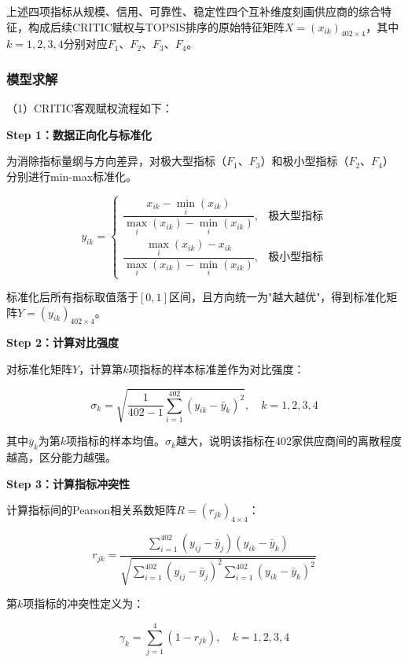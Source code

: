\documentclass[12pt,a4paper]{ctexart}
\theoremstyle{definition}
\theoremstyle{plain}
\theoremstyle{remark}
\begin{document}
上述四项指标从规模、信用、可靠性、稳定性四个互补维度刻画供应商的综合特征，构成后续CRITIC赋权与TOPSIS排序的原始特征矩阵$X = (x_{ik})_{402 \times 4}$，其中$k = 1, 2, 3, 4$分别对应$F_1$、$F_2$、$F_3$、$F_4$。

\subsubsection{模型求解}


（1）CRITIC客观赋权流程如下：

\textbf{Step 1：数据正向化与标准化}

为消除指标量纲与方向差异，对极大型指标（$F_1$、$F_3$）和极小型指标（$F_2$、$F_4$）分别进行min-max标准化。

\begin{equation}
y_{ik} = 
\begin{cases}
\dfrac{x_{ik} - \min_i(x_{ik})}{\max_i(x_{ik}) - \min_i(x_{ik})}, & \text{极大型指标} \\[10pt]
\dfrac{\max_i(x_{ik}) - x_{ik}}{\max_i(x_{ik}) - \min_i(x_{ik})}, & \text{极小型指标}
\end{cases}
\end{equation}

标准化后所有指标取值落于$[0, 1]$区间，且方向统一为"越大越优"，得到标准化矩阵$Y = (y_{ik})_{402 \times 4}$。

\textbf{Step 2：计算对比强度}

对标准化矩阵$Y$，计算第$k$项指标的样本标准差作为对比强度：

\begin{equation}
\sigma_k = \sqrt{\frac{1}{402-1} \sum_{i=1}^{402} (y_{ik} - \bar{y}_k)^2}, \quad k = 1, 2, 3, 4
\end{equation}

其中$\bar{y}_k$为第$k$项指标的样本均值。$\sigma_k$越大，说明该指标在402家供应商间的离散程度越高，区分能力越强。

\textbf{Step 3：计算指标冲突性}

计算指标间的Pearson相关系数矩阵$R = (r_{jk})_{4 \times 4}$：

\begin{equation}
r_{jk} = \frac{\sum_{i=1}^{402}(y_{ij} - \bar{y}_j)(y_{ik} - \bar{y}_k)}{\sqrt{\sum_{i=1}^{402}(y_{ij} - \bar{y}_j)^2 \sum_{i=1}^{402}(y_{ik} - \bar{y}_k)^2}}
\end{equation}

第$k$项指标的冲突性定义为：

\begin{equation}
\gamma_k = \sum_{j=1}^{4} (1 - r_{jk}), \quad k = 1, 2, 3, 4
\end{equation}
\end{document}
